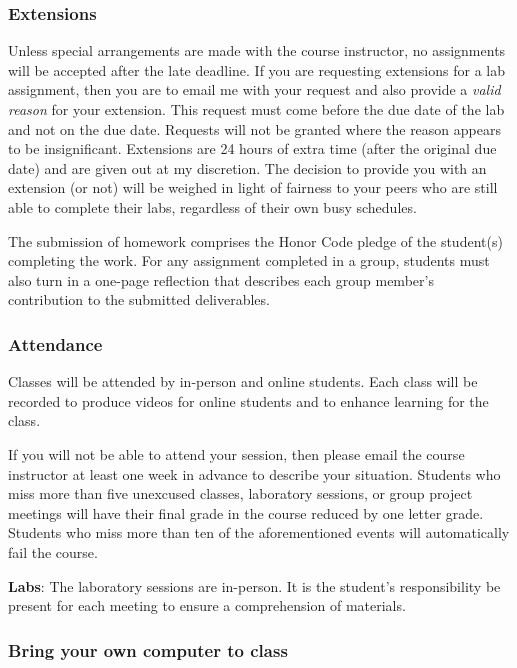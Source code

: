 \documentclass[11pt]{article} %
\begin{document}
\subsubsection*{\textbf{Extensions}}
Unless special arrangements are made with the course instructor, no assignments will be accepted after the late deadline. If you are requesting extensions for a lab assignment, then you are to email me with your request and also provide a \emph{valid reason} for your extension. This request must come before the due date of the lab and not on the due date. Requests will not be granted where the reason appears to be insignificant. Extensions are 24 hours of extra time (after the original due date) and are given out at my discretion. The decision to provide you with an extension (or not) will be weighed in light of fairness to your peers who are still able to complete their labs, regardless of their own busy schedules. 

The submission of homework comprises the Honor Code pledge of the student(s) completing the work. For any assignment completed in a group, students must also turn in a one-page reflection that describes each group member's contribution to the submitted deliverables.  


\subsubsection*{\textbf{Attendance}}

Classes will be attended by in-person and online students. Each class will be recorded to produce videos for online students and to enhance learning for the class.


If you will not be able to attend your session, then please email the course instructor at least one week in advance to describe your situation.  Students who miss more than five unexcused classes, laboratory sessions, or group project meetings will have their final grade in the course reduced by one letter grade. Students who miss more than ten of the aforementioned events will automatically fail the course.


\textbf{Labs}: The laboratory sessions are in-person. It is the student's responsibility be present for each meeting to ensure a comprehension of materials. 

\subsubsection*{\textbf{Bring your own computer to class}}
\end{document}
